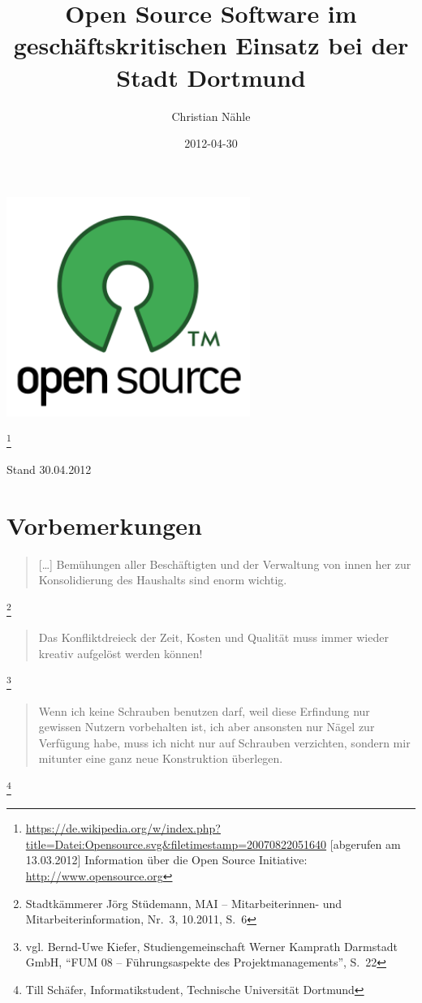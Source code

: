 \documentclass[a4paper]{scrartcl}
\title{Open Source Software im geschäftskritischen Einsatz bei der Stadt Dortmund}
\author{Christian Nähle}
\date{2012-04-30}
\begin{document}
\begin{center}
\includegraphics[width=3.1201in,height=2.8181in]{freiesoftwaredortmund-img1.png}
\end{center}\footnote{\url{https://de.wikipedia.org/w/index.php?title=Datei:Opensource.svg&filetimestamp=20070822051640}
  [abgerufen am 13.03.2012] Information über die Open Source Initiative:
  \href{http://www.opensource.org/}{http://www.opensource.org}}

Stand 30.04.2012

\tableofcontents{}

\section{Vorbemerkungen}

\begin{quote} [\ldots] Bemühungen aller Beschäftigten und der Verwaltung von innen her
  zur Konsolidierung des Haushalts sind enorm wichtig.
\end{quote}\footnote{Stadtkämmerer Jörg Stüdemann, MAI -- Mitarbeiterinnen- und
  Mitarbeiterinformation, Nr.~3, 10.2011, S.~6}

\begin{quote}Das Konfliktdreieck der Zeit, Kosten und Qualität muss immer wieder kreativ
aufgelöst werden können!
\end{quote}\footnote{vgl. Bernd-Uwe Kiefer, Studiengemeinschaft Werner Kamprath
  Darmstadt GmbH, ``FUM 08 -- Führungsaspekte des Projektmanagements'', S.~22}

\begin{quote}Wenn ich keine Schrauben benutzen darf, weil diese Erfindung nur gewissen
  Nutzern vorbehalten ist, ich aber ansonsten nur Nägel zur Verfügung habe, muss
  ich nicht nur auf Schrauben verzichten, sondern mir mitunter eine ganz neue
  Konstruktion überlegen.
\end{quote}\footnote{Till Schäfer, Informatikstudent, Technische Universität
  Dortmund}
\end{document}
